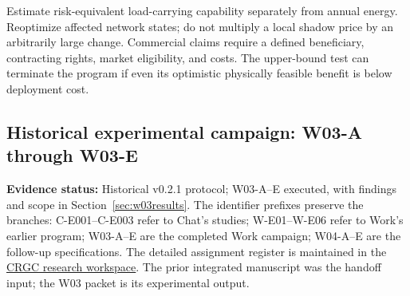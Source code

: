 \documentclass[11pt,letterpaper]{article}
\newcommand{\status}[1]{\textbf{Evidence status:} #1}
\begin{document}
Estimate risk-equivalent load-carrying capability separately from annual energy. Reoptimize affected network states; do not multiply a local shadow price by an arbitrarily large change. Commercial claims require a defined beneficiary, contracting rights, market eligibility, and costs. The upper-bound test can terminate the program if even its optimistic physically feasible benefit is below deployment cost.

\subsection{Historical experimental campaign: W03-A through W03-E}
\label{sec:w03}
\status{Historical v0.2.1 protocol; W03-A--E executed, with findings and scope in Section~\ref{sec:w03results}.} The identifier prefixes preserve the branches: C-E001--C-E003 refer to Chat's studies; W-E01--W-E06 refer to Work's earlier program; W03-A--E are the completed Work campaign; W04-A--E are the follow-up specifications. The detailed assignment register is maintained in the \href{https://chatgpt.com/space/page_dfa9a6f1ac5081919df0487eb77df505}{CRGC research workspace}. The prior integrated manuscript was the handoff input; the W03 packet is its experimental output.
\end{document}
